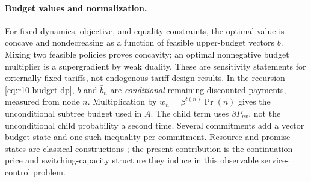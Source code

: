\paragraph{Budget values and normalization.}
For fixed dynamics, objective, and equality constraints, the optimal value is concave and nondecreasing as a function of feasible upper-budget vectors $b$. Mixing two feasible policies proves concavity; an optimal nonnegative budget multiplier is a supergradient by weak duality. These are sensitivity statements for externally fixed tariffs, not endogenous tariff-design results. In the recursion \eqref{eq:r10-budget-dp}, $b$ and $\bar b_n$ are \emph{conditional} remaining discounted payments, measured from node $n$. Multiplication by $w_n=\beta^{t(n)}\Pr(n)$ gives the unconditional subtree budget used in $A$. The child term uses $\beta P_{nv}$, not the unconditional child probability a second time. Several commitments add a vector budget state and one such inequality per commitment. Resource and promise states are classical constructions \citep{Altman1999,SpearSrivastava1987,ThomasWorrall1988}; the present contribution is the continuation-price and switching-capacity structure they induce in this observable service-control problem.
